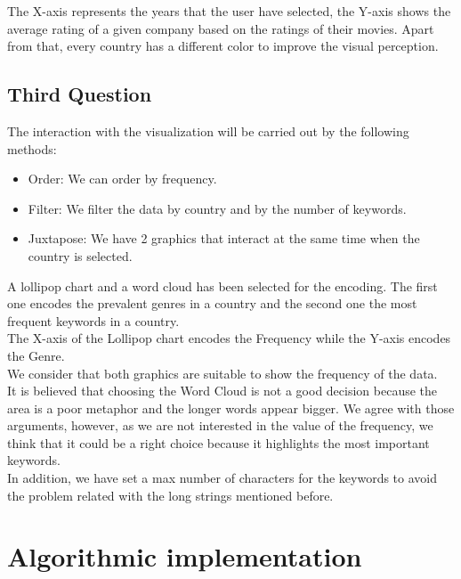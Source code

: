 The X-axis represents the years that the user have selected, the Y-axis shows the average rating of a given company based on the ratings of their movies. Apart from that, every country has a different color to improve the visual perception.\\

\subsection{Third Question}

The interaction with the visualization will be carried out by the following methods:

\begin{itemize}
	\item Order: We can order by frequency.
	\item Filter: We filter the data by country and by the number of keywords.
	\item Juxtapose: We have 2 graphics that interact at the same time when the country is selected.
\end{itemize}

A lollipop chart and a word cloud has been selected for the encoding. The first one encodes the prevalent genres in a country and the second one the most frequent keywords in a country.\\

The X-axis of the Lollipop chart encodes the Frequency while the Y-axis encodes the Genre.\\

We consider that both graphics are suitable to show the frequency of the data.\\

It is believed that choosing the Word Cloud is not a good decision because the area is a poor metaphor and the longer words appear bigger. We agree with those arguments, however, as we are not interested in the value of the frequency, we think that it could be a right choice because it highlights the most important keywords.\\

In addition, we have set a max number of characters for the keywords to avoid the problem related with the long strings mentioned before.\\

\section{Algorithmic implementation}

